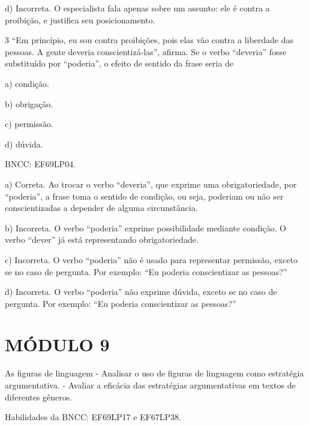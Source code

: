 {d) Incorreta. O especialista fala apenas sobre um assunto: ele é contra
a proibição, e justifica seu posicionamento.

\num{3} ``Em princípio, eu sou contra proibições, pois elas vão contra a
liberdade das pessoas. A gente deveria conscientizá-las'', afirma. Se o
verbo ``deveria'' fosse substituído por ``poderia'', o efeito de sentido
da frase seria de

a) condição.

b) obrigação.

c) permissão.

d) dúvida.

BNCC: EF69LP04.

a) Correta. Ao trocar o verbo ``deveria'', que exprime uma
obrigatoriedade, por ``poderia'', a frase toma o sentido de condição, ou
seja, poderiam ou não ser conscientizadas a depender de alguma
circunstância.

b) Incorreta. O verbo ``poderia'' exprime possibilidade mediante
condição. O verbo ``dever'' já está representando obrigatoriedade.

c) Incorreta. O verbo ``poderia'' não é usado para representar
permissão, exceto se no caso de pergunta. Por exemplo: ``Eu poderia
conscientizar as pessoas?''

d) Incorreta. O verbo ``poderia'' não exprime dúvida, exceto se no caso
de pergunta. Por exemplo: ``Eu poderia conscientizar as pessoas?''

\section{MÓDULO 9}

As figuras de linguagem - Analisar o uso de figuras de linguagem como
estratégia argumentativa. - Avaliar a eficácia das estratégias
argumentativas em textos de diferentes gêneros.

Habilidades da BNCC: EF69LP17 e EF67LP38.

}
